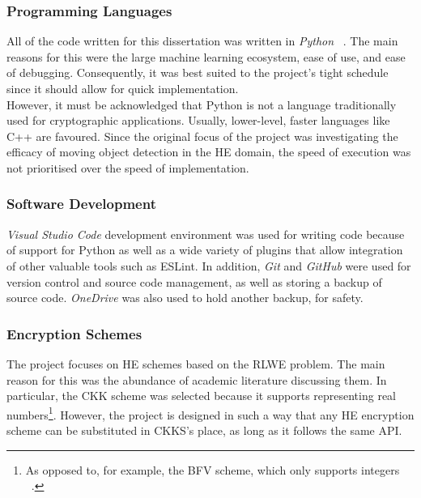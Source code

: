 \subsubsection{Programming Languages}
\setlength{\leftskip}{0.5cm}
\indent \indent
All of the code written for this dissertation was written in \textit{Python} ~\cite{Python}.  The main reasons for this were the large machine learning ecosystem, ease of use, and ease of debugging. Consequently, it was best suited to the project's tight schedule since it should allow for quick implementation.
\smallskip \\ \indent
However, it must be acknowledged that Python is not a language traditionally used for cryptographic applications. Usually, lower-level, faster languages like C++ are favoured. Since the original focus of the project was investigating the efficacy of moving object detection in the HE domain, the speed of execution was not prioritised over the speed of implementation.

\setlength{\leftskip}{0cm}
\subsubsection{Software Development}
\setlength{\leftskip}{0.5cm}
\indent \indent
\textit{Visual Studio Code} \cite{VSCode} development environment was used for writing code because of support for Python as well as a wide variety of plugins that allow integration of other valuable tools such as ESLint.  In addition, \textit{Git} \cite{Git} and \textit{GitHub} \cite{Github} were used for version control and source code management, as well as storing a backup of source code. \textit{OneDrive} \cite{OneDrive} was also used to hold another backup, for safety.

\setlength{\leftskip}{0cm}
\subsubsection{Encryption Schemes}
\setlength{\leftskip}{0.5cm}
\indent \indent
The project focuses on HE schemes based on the RLWE problem. The main reason for this was the abundance of academic literature discussing them. In particular, the CKK scheme \cite{CKKS} was selected because it supports representing real numbers\footnote{As opposed to, for example, the BFV scheme, which only supports integers ~\cite{BFV1, BFV2}.}. However, the project is designed in such a way that any HE encryption scheme can be substituted in CKKS's place, as long as it follows the same API.

